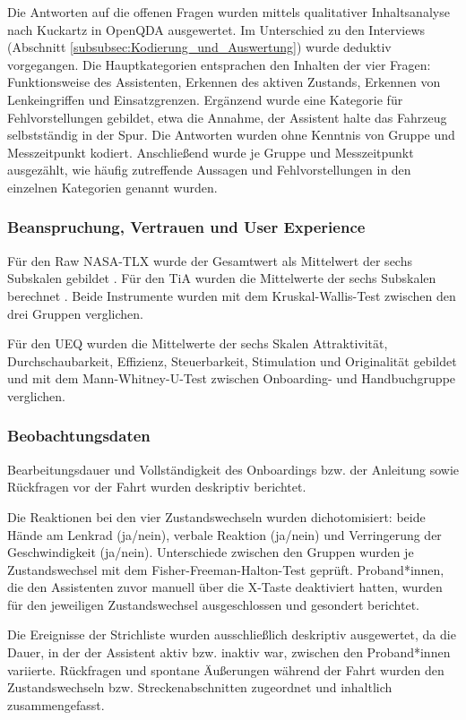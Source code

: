 Die Antworten auf die offenen Fragen wurden mittels qualitativer Inhaltsanalyse nach Kuckartz \cite{kuckartz2014mixed} in OpenQDA \cite{kuester2026openqda} ausgewertet. Im Unterschied zu den Interviews (Abschnitt \ref{subsubsec:Kodierung_und_Auswertung}) wurde deduktiv vorgegangen. Die Hauptkategorien entsprachen den Inhalten der vier Fragen: Funktionsweise des Assistenten, Erkennen des aktiven Zustands, Erkennen von Lenkeingriffen und Einsatzgrenzen. Ergänzend wurde eine Kategorie für Fehlvorstellungen gebildet, etwa die Annahme, der Assistent halte das Fahrzeug selbstständig in der Spur. Die Antworten wurden ohne Kenntnis von Gruppe und Messzeitpunkt kodiert. Anschließend wurde je Gruppe und Messzeitpunkt ausgezählt, wie häufig zutreffende Aussagen und Fehlvorstellungen in den einzelnen Kategorien genannt wurden.

\subsubsection{Beanspruchung, Vertrauen und User Experience}

Für den Raw NASA-TLX wurde der Gesamtwert als Mittelwert der sechs Subskalen gebildet \cite{hart2006nasatlx}. Für den TiA wurden die Mittelwerte der sechs Subskalen berechnet \cite{korber_tia_de}. Beide Instrumente wurden mit dem Kruskal-Wallis-Test zwischen den drei Gruppen verglichen.

Für den UEQ wurden die Mittelwerte der sechs Skalen Attraktivität, Durchschaubarkeit, Effizienz, Steuerbarkeit, Stimulation und Originalität gebildet \cite{laugwitz2008ueq} und mit dem Mann-Whitney-U-Test zwischen Onboarding- und Handbuchgruppe verglichen.

\subsubsection{Beobachtungsdaten}

Bearbeitungsdauer und Vollständigkeit des Onboardings bzw. der Anleitung sowie Rückfragen vor der Fahrt wurden deskriptiv berichtet.

Die Reaktionen bei den vier Zustandswechseln wurden dichotomisiert: beide Hände am Lenkrad (ja/nein), verbale Reaktion (ja/nein) und Verringerung der Geschwindigkeit (ja/nein). Unterschiede zwischen den Gruppen wurden je Zustandswechsel mit dem Fisher-Freeman-Halton-Test geprüft. Proband*innen, die den Assistenten zuvor manuell über die X-Taste deaktiviert hatten, wurden für den jeweiligen Zustandswechsel ausgeschlossen und gesondert berichtet.

Die Ereignisse der Strichliste wurden ausschließlich deskriptiv ausgewertet, da die Dauer, in der der Assistent aktiv bzw. inaktiv war, zwischen den Proband*innen variierte. Rückfragen und spontane Äußerungen während der Fahrt wurden den Zustandswechseln bzw. Streckenabschnitten zugeordnet und inhaltlich zusammengefasst.